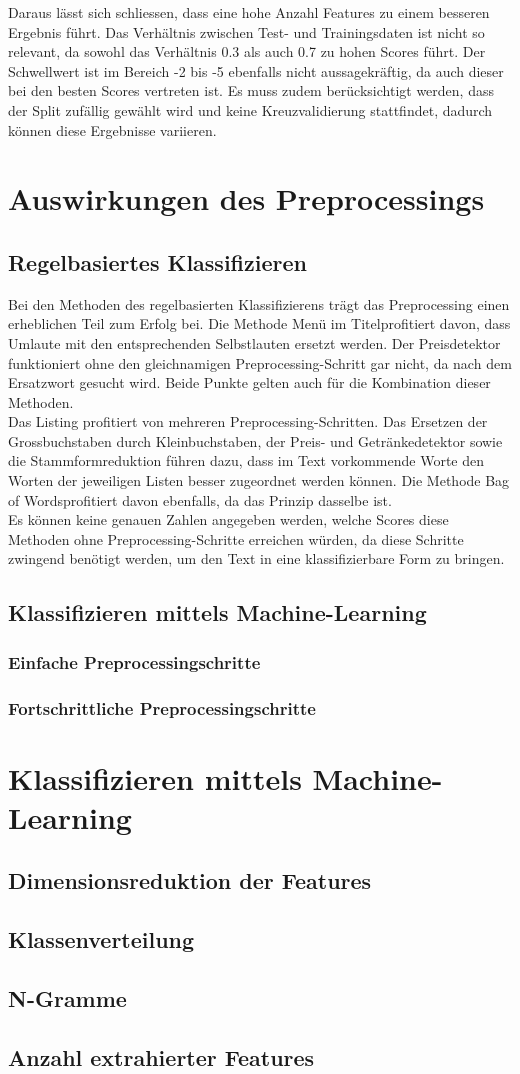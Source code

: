 Daraus lässt sich schliessen, dass eine hohe Anzahl Features zu einem besseren Ergebnis führt.
Das Verhältnis zwischen Test- und Trainingsdaten ist nicht so relevant, da sowohl das Verhältnis 0.3 als auch 0.7 zu hohen Scores führt.
Der Schwellwert ist im Bereich -2 bis -5 ebenfalls nicht aussagekräftig, da auch dieser bei den besten Scores vertreten ist.
Es muss zudem berücksichtigt werden, dass der Split zufällig gewählt wird und keine Kreuzvalidierung stattfindet, dadurch können diese Ergebnisse variieren.
\section{Auswirkungen des Preprocessings}
\subsection{Regelbasiertes Klassifizieren}
Bei den Methoden des regelbasierten Klassifizierens trägt das Preprocessing einen erheblichen Teil zum Erfolg bei.
Die Methode \glqq Menü im Titel\grqq profitiert davon, dass Umlaute mit den entsprechenden Selbstlauten ersetzt werden.
Der Preisdetektor funktioniert ohne den gleichnamigen Preprocessing-Schritt gar nicht, da nach dem Ersatzwort gesucht wird.
Beide Punkte gelten auch für die Kombination dieser Methoden.\\
Das Listing profitiert von mehreren Preprocessing-Schritten.
Das Ersetzen der Grossbuchstaben durch Kleinbuchstaben, der Preis- und Getränkedetektor sowie die Stammformreduktion führen dazu, dass im Text vorkommende Worte den Worten der jeweiligen Listen besser zugeordnet werden können.
Die Methode \glqq Bag of Words\grqq profitiert davon ebenfalls, da das Prinzip dasselbe ist.\\
Es können keine genauen Zahlen angegeben werden, welche Scores diese Methoden ohne Preprocessing-Schritte erreichen würden, da diese Schritte zwingend benötigt werden, um den Text in eine klassifizierbare Form zu bringen.
\subsection{Klassifizieren mittels Machine-Learning}
\subsubsection{Einfache Preprocessingschritte}
\subsubsection{Fortschrittliche Preprocessingschritte}
\section{Klassifizieren mittels Machine-Learning}
\subsection{Dimensionsreduktion der Features}
\subsection{Klassenverteilung}
\subsection{N-Gramme}
\subsection{Anzahl extrahierter Features}

